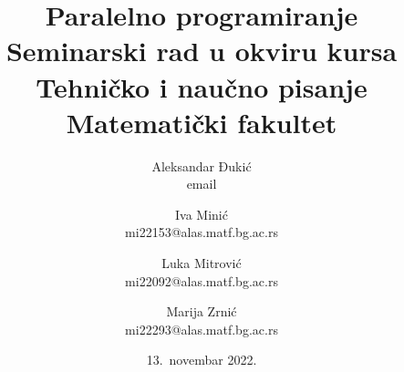 \documentclass[a4paper]{article}
\begin{document}
	
	\title{Paralelno programiranje\\ \small{Seminarski rad u okviru kursa\\Tehničko i naučno pisanje\\ Matematički fakultet}}
	
	\author
	{
		Aleksandar Đukić\\email
		\and
		Iva Minić\\mi22153@alas.matf.bg.ac.rs
		\and
		Luka Mitrović\\mi22092@alas.matf.bg.ac.rs
		\and
		Marija Zrnić\\mi22293@alas.matf.bg.ac.rs
	}
	
	\date{13.~novembar 2022.}
	\maketitle
	
\end{document}
